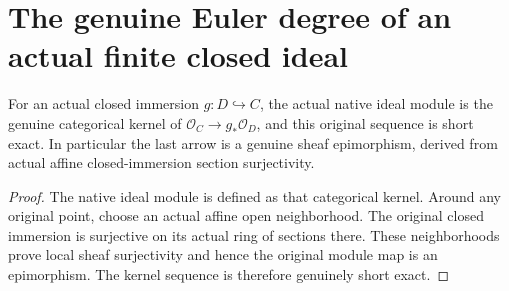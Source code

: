 \section{The genuine Euler degree of an actual finite closed ideal}

\begin{theorem}
\label{thm:fc-finite-closed-ideal-sequence}
\leanok
{}
For an actual closed immersion $g:D\hookrightarrow C$, the actual
native ideal module is the genuine categorical kernel of
$\mathcal O_C\to g_*\mathcal O_D$, and this original sequence is short
exact. In particular the last arrow is a genuine sheaf epimorphism,
derived from actual affine closed-immersion section surjectivity.
\end{theorem}
\begin{proof}
The native ideal module is defined as that categorical kernel.
Around any original point, choose an actual affine open neighborhood.
The original closed immersion is surjective on its actual ring of
sections there. These neighborhoods prove local sheaf surjectivity and
hence the original module map is an epimorphism. The kernel sequence
is therefore genuinely short exact.
\end{proof}

